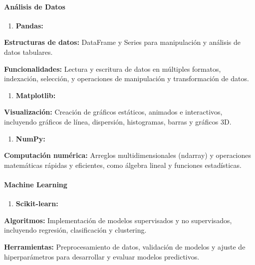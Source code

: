 \documentclass[letterpaper]{article}
\newcommand\textstyleStrong[1]{\textbf{#1}}
\begin{document}
\paragraph{Análisis de Datos}
\begin{enumerate}[series=listWWNumiv,label=\arabic*.,ref=\arabic*]
\item {
\textstyleStrong{Pandas:}}
\end{enumerate}
{
\textstyleStrong{Estructuras de datos:} DataFrame y Series para manipulación y análisis de datos tabulares.}

{
\textstyleStrong{Funcionalidades:} Lectura y escritura de datos en múltiples formatos, indexación, selección, y
operaciones de manipulación y transformación de datos.}

\begin{enumerate}[resume*=listWWNumiv]
\item {
\textstyleStrong{Matplotlib:}}
\end{enumerate}
{
\textstyleStrong{Visualización:} Creación de gráficos estáticos, animados e interactivos, incluyendo gráficos de línea,
dispersión, histogramas, barras y gráficos 3D.}

\begin{enumerate}[resume*=listWWNumiv]
\item {
\textstyleStrong{NumPy:}}
\end{enumerate}
{
\textstyleStrong{Computación numérica:} Arreglos multidimensionales (ndarray) y operaciones matemáticas rápidas y
eficientes, como álgebra lineal y funciones estadísticas.}

\paragraph{Machine Learning}
\begin{enumerate}[series=listWWNumv,label=\arabic*.,ref=\arabic*]
\item {
\textstyleStrong{Scikit-learn:}}
\end{enumerate}
{
\textstyleStrong{Algoritmos:} Implementación de modelos supervisados y no supervisados, incluyendo regresión,
clasificación y clustering.}

{
\textstyleStrong{Herramientas:} Preprocesamiento de datos, validación de modelos y ajuste de hiperparámetros para
desarrollar y evaluar modelos predictivos.}
\end{document}
